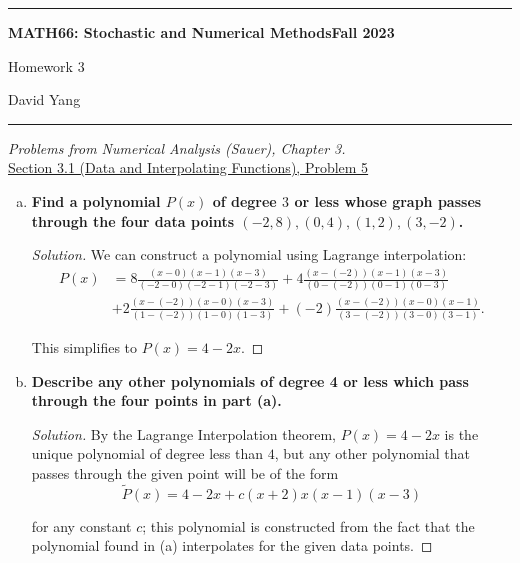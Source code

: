 \documentclass[11pt]{article}
\newenvironment{solution}
  {\renewcommand\qedsymbol{$\blacksquare$}\begin{proof}[Solution]}
  {\end{proof}}
\theoremstyle{definition}
\begin{document}
	\hrule
	\begin{center}
        \textbf{MATH66: Stochastic and Numerical Methods}\hfill \textbf{Fall 2023}\newline

		{\Large Homework 3}

		David Yang
	\end{center}

\hrule

\vspace{1em}

\textit{Problems from Numerical Analysis (Sauer), Chapter 3.} \\

\underline{Section 3.1 (Data and Interpolating Functions), Problem 5} \\

\begin{enumerate}[a)]
    \item \textbf{Find a polynomial $P(x)$ of degree $3$ or less whose graph passes through the four data points $(-2, 8), (0, 4), (1, 2), (3, -2)$.}
    
    \begin{solution}
    We can construct a polynomial using Lagrange interpolation:
    \begin{align*}
         P(x) &= 8\frac{(x-0)(x-1)(x-3)}{(-2-0)(-2-1)(-2-3)} + 4\frac{(x-(-2))(x-1)(x-3)}{(0-(-2))(0-1)(0-3)} \\
         &+  2\frac{(x-(-2))(x-0)(x-3)}{(1-(-2))(1-0)(1-3)}  + (-2)\frac{(x-(-2))(x-0)(x-1)}{(3-(-2))(3-0)(3-1)}.\end{align*}
    
    This simplifies to $\boxed{P(x) = 4-2x}$.
    \end{solution}
    
    \item \textbf{Describe any other polynomials of degree 4 or less which pass through the four points in part (a).}
  
    \begin{solution}
        By the Lagrange Interpolation theorem, $P(x) = 4-2x$ is the unique polynomial of degree less than $4$, but any other polynomial that passes through the given point will be of the form
        \[ \boxed{\tilde{P}(x) = 4-2x + c(x+2)x(x-1)(x-3)} \]
    
        for any constant $c$; this polynomial is constructed from the fact that the polynomial found in (a) interpolates for the given data points.
    \end{solution}
\end{enumerate}
\end{document}

